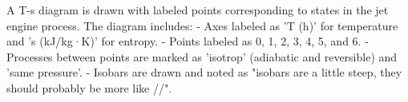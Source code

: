 A T-s diagram is drawn with labeled points corresponding to states in the jet engine process. The diagram includes:  
- Axes labeled as 'T (h)' for temperature and 's (kJ/kg·K)' for entropy.  
- Points labeled as 0, 1, 2, 3, 4, 5, and 6.  
- Processes between points are marked as 'isotrop' (adiabatic and reversible) and 'same pressure'.  
- Isobars are drawn and noted as "isobars are a little steep, they should probably be more like //".